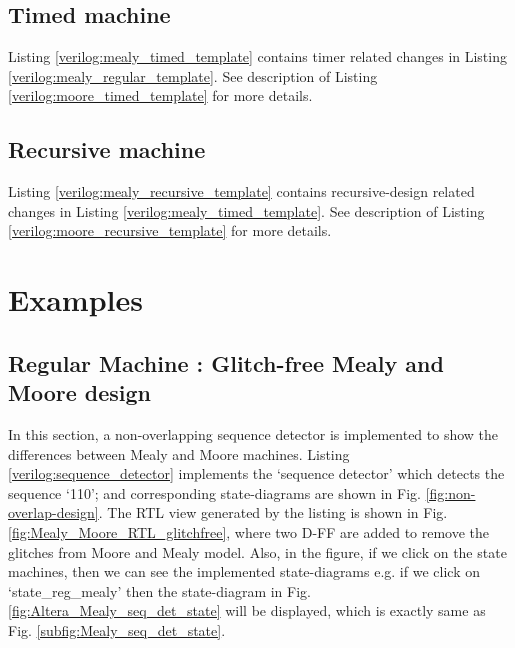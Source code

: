 \subsection{Timed machine}
Listing \ref{verilog:mealy_timed_template} contains timer related changes in Listing \ref{verilog:mealy_regular_template}. See description of Listing \ref{verilog:moore_timed_template} for more details. 


\subsection{Recursive machine}

Listing \ref{verilog:mealy_recursive_template} contains recursive-design related changes in Listing \ref{verilog:mealy_timed_template}. See description of Listing \ref{verilog:moore_recursive_template} for more details. 




\section{Examples} \label{sec:VerilogtemplateExample}

\subsection{Regular Machine : Glitch-free Mealy and Moore design} \label{sec:exampleRegularMMGlitchFree}
In this section, a non-overlapping sequence detector is implemented to show the differences between Mealy and Moore machines. Listing \ref{verilog:sequence_detector} implements the `sequence detector' which detects the sequence `110'; and corresponding state-diagrams are shown in Fig. \ref{fig:non-overlap-design}. The RTL view generated by the listing is shown in Fig. \ref{fig:Mealy_Moore_RTL_glitchfree}, where two D-FF are added to remove the glitches from Moore and Mealy model. Also, in the figure, if we click on the state machines, then we can see the implemented state-diagrams e.g. if we click on `state\_reg\_mealy' then the state-diagram in Fig. \ref{fig:Altera_Mealy_seq_det_state} will be displayed, which is exactly same as Fig. \ref{subfig:Mealy_seq_det_state}. 


